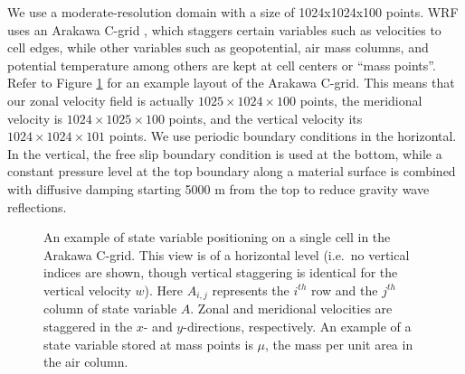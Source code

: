 We use a moderate-resolution domain with a size of 1024x1024x100  points.  WRF uses an Arakawa C-grid \cite{Arakawa1977}, which staggers certain variables such as velocities to cell edges, while other variables such as geopotential, air mass columns, and potential temperature among others are kept at cell centers or ``mass points''. Refer to Figure \ref{fig:Cgrid} for an example layout of the Arakawa C-grid. This means that our zonal velocity field is actually $1025 \times 1024 \times 100$ points, the meridional velocity is $1024 \times 1025 \times 100$ points, and the vertical velocity its $1024 \times 1024 \times 101$ points. We use periodic boundary conditions in the horizontal. In the vertical, the free slip boundary condition is used at the bottom, while a constant pressure level at the top boundary along a material surface is combined with diffusive damping starting 5000 m from the top to reduce gravity wave reflections. \\
\begin{figure}[H]
\begin{center}
\caption{An example of state variable positioning on a single cell in the Arakawa C-grid. This view is of a horizontal level (i.e.\ no vertical indices are shown, though vertical staggering is identical for the vertical velocity $w$). Here $A_{i,j}$ represents the $i^{th}$ row and the $j^{th}$ column of state variable $A$. Zonal and meridional velocities are staggered in the $x$- and $y$-directions, respectively. An example of a state variable stored at mass points is $\mu$, the mass per unit area in the air column.}
\label{fig:Cgrid}
\end{center}
\end{figure}

